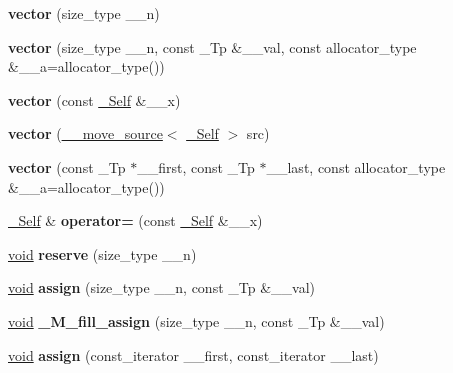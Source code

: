\begin{DoxyCompactItemize}
{\bfseries vector} (size\+\_\+type \+\_\+\+\_\+n)
\item 
\mbox{\label{structvector_a3402ccf9fd3ecb86697512daf279aa79}} 
{\bfseries vector} (size\+\_\+type \+\_\+\+\_\+n, const \+\_\+\+Tp \&\+\_\+\+\_\+val, const allocator\+\_\+type \&\+\_\+\+\_\+a=allocator\+\_\+type())
\item 
\mbox{\label{structvector_a3059188b3b0449014b97b57ffca94e37}} 
{\bfseries vector} (const \hyperlink{structvector}{\+\_\+\+Self} \&\+\_\+\+\_\+x)
\item 
\mbox{\label{structvector_a454e6a51108b8425877350149688b493}} 
{\bfseries vector} (\hyperlink{class____move__source}{\+\_\+\+\_\+move\+\_\+source}$<$ \hyperlink{structvector}{\+\_\+\+Self} $>$ src)
\item 
\mbox{\label{structvector_af31c912c2807af1d39f61d262f33d27f}} 
{\bfseries vector} (const \+\_\+\+Tp $\ast$\+\_\+\+\_\+first, const \+\_\+\+Tp $\ast$\+\_\+\+\_\+last, const allocator\+\_\+type \&\+\_\+\+\_\+a=allocator\+\_\+type())
\item 
\mbox{\label{structvector_a6197d29c5b5e2739476561148c179910}} 
\hyperlink{structvector}{\+\_\+\+Self} \& {\bfseries operator=} (const \hyperlink{structvector}{\+\_\+\+Self} \&\+\_\+\+\_\+x)
\item 
\mbox{\label{structvector_a1db39f241a3e52fb04799fdf5951dfab}} 
\hyperlink{interfacevoid}{void} {\bfseries reserve} (size\+\_\+type \+\_\+\+\_\+n)
\item 
\mbox{\label{structvector_ad19fffd3e7fa3c4700319593a5dd972c}} 
\hyperlink{interfacevoid}{void} {\bfseries assign} (size\+\_\+type \+\_\+\+\_\+n, const \+\_\+\+Tp \&\+\_\+\+\_\+val)
\item 
\mbox{\label{structvector_ab974d139db728bdc158fa8f4bbd36b4b}} 
\hyperlink{interfacevoid}{void} {\bfseries \+\_\+\+M\+\_\+fill\+\_\+assign} (size\+\_\+type \+\_\+\+\_\+n, const \+\_\+\+Tp \&\+\_\+\+\_\+val)
\item 
\mbox{\label{structvector_a2147001ab9ed400b65b138dbdb35e27b}} 
\hyperlink{interfacevoid}{void} {\bfseries assign} (const\+\_\+iterator \+\_\+\+\_\+first, const\+\_\+iterator \+\_\+\+\_\+last)

\end{DoxyCompactItemize}
